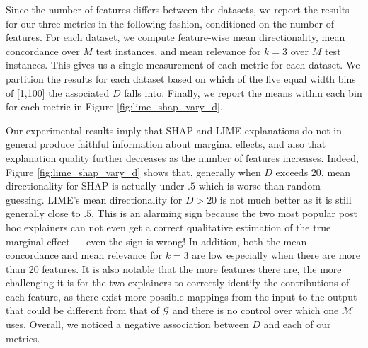 \documentclass[mnsc,blindrev]{informs3}
\newcommand{\mG}{\mathcal{G}}
\newcommand{\mM}{\mathcal{M}}
\begin{document}
        Since the number of features differs between the datasets, we report the results for our three metrics in the following fashion, conditioned on the number of features. %
        For each dataset, we compute feature-wise mean directionality, mean concordance over $M$ test instances, and mean relevance for $k=3$ over $M$ test instances. This gives us a single measurement of each metric for each dataset. We partition the results for each dataset based on which of the five equal width bins of [1,100] the associated $D$ falls into. Finally, we report the means within each bin for each metric in Figure \ref{fig:lime_shap_vary_d}.  %

    
    Our experimental results imply that SHAP and LIME explanations do not in general produce faithful information about marginal effects, and also that explanation quality further decreases as the number of features increases. Indeed, Figure \ref{fig:lime_shap_vary_d} shows that, generally when $D$ exceeds $20$, mean directionality for SHAP is actually under $.5$ which is worse than random guessing. LIME's mean directionality for $D> 20$ is not much better as it is still generally close to $.5$. This is an alarming sign because the two most popular post hoc explainers can not even get a correct qualitative estimation of the true marginal effect --- even the sign is wrong! In addition, both the mean concordance and mean relevance for $k=3$ are low especially when there are more than 20 features. It is also notable that the more features there are, the more challenging it is for the two explainers to correctly identify the contributions of each feature, as there exist more possible mappings from the input to the output that could be different from that of $\mG$ and there is no control over which one $\mM$ uses. Overall, we noticed a negative association between $D$ and each of our metrics. 
\end{document}
